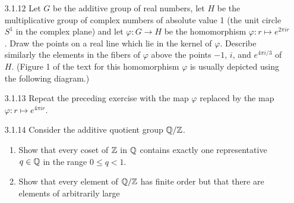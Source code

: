 \begin{enumerate}
   \item[3.1.12]  Let $G$ be the additive group of real numbers, let $H$ be the
                  multiplicative group of complex numbers of absolute value 1
                  (the unit circle $S^1$ in the complex plane) and let
                  $\varphi : G \rightarrow H$ be the homomorphism
                  $\varphi : r \mapsto e^{2\pi ir}$. Draw the points on a real
                  line which lie in the kernel of $\varphi$. Describe similarly
                  the elements in the fibers of $\varphi$ above the points $-1$,
                  $i$, and $e^{4\pi i/3}$ of $H$. (Figure 1 of the text for this
                  homomorphism $\varphi$ is usually depicted using the following
                  diagram.)
   \item[3.1.13]  Repeat the preceding exercise with the map $\varphi$ replaced
                  by the map $\varphi : r \mapsto e^{4\pi ir}$.
   \item[3.1.14]  Consider the additive quotient group $\mathbb{Q}/\mathbb{Z}$.
                  \begin{enumerate}
                     \item Show that every coset of $\mathbb{Z}$ in $\mathbb{Q}$ contains
                           exactly one representative $q \in \mathbb{Q}$ in the range
                           $0 \le q < 1$.
                     \item Show that every element of $\mathbb{Q}/\mathbb{Z}$ has finite order
                           but that there are elements of arbitrarily large

\end{enumerate}
\end{enumerate}
